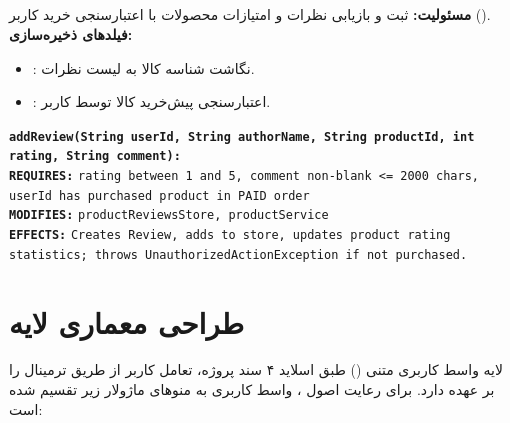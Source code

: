 \documentclass[11pt,a4paper]{article}
\begin{document}
\subsection{}
\textbf{مسئولیت:} ثبت و بازیابی نظرات و امتیازات محصولات با اعتبارسنجی خرید کاربر ().\\
\textbf{فیلدهای ذخیره‌سازی:}
\begin{itemize}
    \item {}: نگاشت شناسه کالا به لیست نظرات.
    \item {}: اعتبارسنجی پیش‌خرید کالا توسط کاربر.
\end{itemize}
\begin{contractbox}
\begin{latin}
\setlength{\parindent}{0pt}
\setlength{\parskip}{2pt}
\small
\textbf{\color{autnavy}\texttt{addReview(String userId, String authorName, String productId, int rating, String comment):}} \\
\hspace*{1.5em}\textbf{\color{darkred}\texttt{REQUIRES:}} \texttt{rating between 1 and 5, comment non-blank <= 2000 chars, userId has purchased product in PAID order} \\
\hspace*{1.5em}\textbf{\color{autblue}\texttt{MODIFIES:}} \texttt{productReviewsStore, productService} \\
\hspace*{1.5em}\textbf{\color{autteal}\texttt{EFFECTS:}}  \texttt{Creates Review, adds to store, updates product rating statistics; throws UnauthorizedActionException if not purchased.}
\end{latin}
\end{contractbox}

\newpage
\section{طراحی معماری لایه }

لایه واسط کاربری متنی () طبق اسلاید ۴ سند پروژه، تعامل کاربر از طریق ترمینال را بر عهده دارد. برای رعایت اصول ، واسط کاربری به منوهای ماژولار زیر تقسیم شده است:
\end{document}
